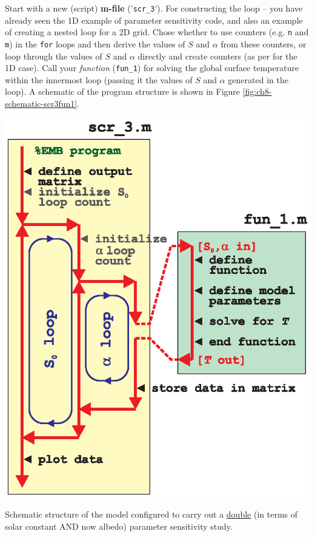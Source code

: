 \documentclass{tufte-book} %
\begin{document}
\pagebreak

Start with a new (script) \textbf{m-file} ('\texttt{scr\_3}'). For constructing the loop -- you have already seen the 1D example of parameter sensitivity code, and also an example of creating a nested loop for a 2D grid. Chose whether to use counters (e.g. \texttt{n} and \texttt{m}) in the \texttt{for} loops and then derive the values of  \(S\) and \(\alpha\)
from these counters, 
 or loop through the values of  \(S\) and \(\alpha\)
directly and create counters (as per for the 1D case).
 Call your \textit{function} (\texttt{fun\_1}) for solving the global surface temperature within the innermost loop (passing it the values of \(S\) and \(\alpha\) generated in the loop). A schematic of the program structure is shown in Figure \ref{fig:ch8-schematic-scr3fun1}.

\begin{marginfigure}[0.0in]
\includegraphics[width=\linewidth]{ch8-schematic-scr3fun1.eps}
\caption{Schematic structure of the model configured to carry out a \uline{double} (in terms of solar constant AND now albedo) parameter sensitivity study.}
\label{fig:ch8-schematic-scr3fun1}
\end{marginfigure}
\end{document}
